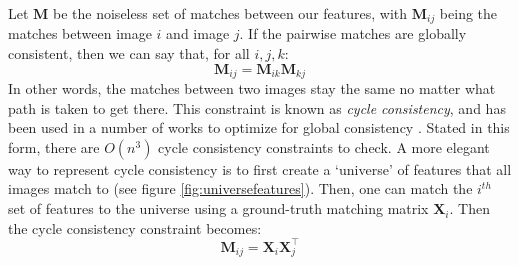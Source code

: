 \documentclass[10pt,twocolumn,letterpaper]{article}
\newcommand{\mat}[1]{\mathbf{#1}}
\begin{document}
Let $\mat{M}$ be the noiseless set of matches between our features, with $\mat{M}_{ij}$ being the matches between image $i$ and image $j$.
If the pairwise matches are globally consistent, then we can say that, for all $i, j, k$:
\begin{equation}
\mat{M}_{ij} = \mat{M}_{ik} \mat{M}_{kj}
\label{eq:cycconsist1}
\end{equation}
In other words, the matches between two images stay the same no matter what path is taken to get there. 
This constraint is known as \textit{cycle consistency}, and has been used in a number of works to optimize for global consistency \cite{zhou2015multi, wang2017multi, leonardos2016distributed}.
Stated in this form, there are $O(n^3)$ cycle consistency constraints to check.
A more elegant way to represent cycle consistency is to first create a `universe' of features that all images match to (see figure \ref{fig:universefeatures}).
Then, one can match the $i^{th}$ set of features to the universe using a ground-truth matching matrix $\mat{X}_i$.
Then the cycle consistency constraint becomes:
\begin{equation}
\mat{M}_{ij} = \mat{X}_{i}\mat{X}_{j}^\top
\label{eq:cycconsist2}
\end{equation}
\end{document}
